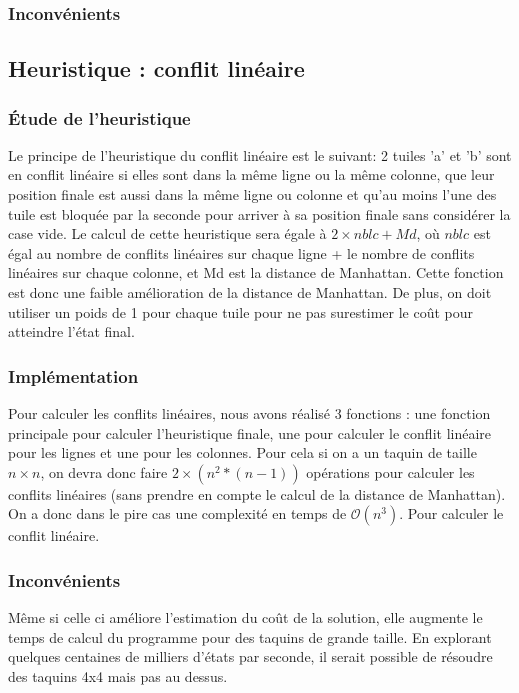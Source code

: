 \documentclass[a4paper, 12pt]{article}
\begin{document}
\subsubsection{Inconvénients}

\subsection{Heuristique : conflit linéaire}


\subsubsection{Étude de l'heuristique}

Le principe de l'heuristique du conflit linéaire est le suivant: 2 tuiles 'a' et 'b' sont en conflit linéaire si elles sont dans la même ligne ou la même colonne, que leur position finale est aussi dans la même ligne ou colonne et qu'au moins l'une des tuile est bloquée par la seconde pour arriver à sa position finale sans considérer la case vide.
Le calcul de cette heuristique sera égale à $2 \times nblc + Md$, où $nblc$ est égal au nombre de conflits linéaires sur chaque ligne + le nombre de conflits linéaires sur chaque colonne, et Md est la distance de Manhattan. Cette fonction est donc une faible amélioration de la distance de Manhattan. De plus, on doit utiliser un poids de 1 pour chaque tuile pour ne pas surestimer le coût pour atteindre l'état final.

\subsubsection{Implémentation}

Pour calculer les conflits linéaires, nous avons réalisé 3 fonctions : une fonction principale pour calculer l'heuristique finale, une pour calculer le conflit linéaire pour les lignes et une pour les colonnes. Pour cela si on a un taquin de taille $n \times n$, on devra donc faire $2 \times (n^2*(n-1))$ opérations pour calculer les conflits linéaires (sans prendre en compte le calcul de la distance de Manhattan).
On a donc dans le pire cas une complexité en temps de $ \mathcal{O}(n^3)$. Pour calculer le conflit linéaire.

\subsubsection{Inconvénients}

Même si celle ci améliore l'estimation du coût de la solution, elle augmente le temps de calcul du programme pour des taquins de grande taille.
En explorant quelques centaines de milliers d'états par seconde, il serait possible de résoudre des taquins 4x4 mais pas au dessus.
\end{document}
